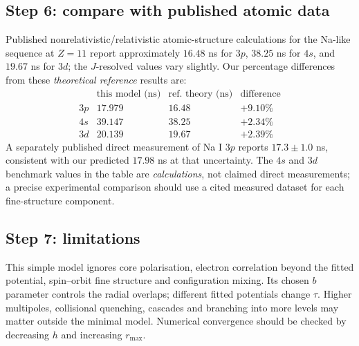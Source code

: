 \subsection*{Step 6: compare with published atomic data}
Published nonrelativistic/relativistic
atomic-structure calculations for the Na-like
sequence at \(Z=11\) report approximately
\(16.48\) ns for \(3p\), \(38.25\) ns for
\(4s\), and \(19.67\) ns for \(3d\);
the \(J\)-resolved values vary slightly.
Our percentage differences from these
\emph{theoretical reference} results are:
\[
\begin{array}{c|r|r|r}
&\text{this model (ns)}&
\text{ref. theory (ns)}&
\text{difference}\\\hline
3p&17.979&16.48&+9.10\%\\
4s&39.147&38.25&+2.34\%\\
3d&20.139&19.67&+2.39\%
\end{array}
\]
A separately published direct measurement
of Na I \(3p\) reports \(17.3\pm1.0\) ns,
consistent with our predicted \(17.98\) ns
at that uncertainty. The \(4s\) and \(3d\)
benchmark values in the table are
\emph{calculations}, not claimed direct
measurements; a precise experimental
comparison should use a cited measured
dataset for each fine-structure component.

\subsection*{Step 7: limitations}
This simple model ignores core polarisation,
electron correlation beyond the fitted
potential, spin--orbit fine structure and
configuration mixing. Its chosen \(b\)
parameter controls the radial overlaps;
different fitted potentials change \(\tau\).
Higher multipoles, collisional quenching,
cascades and branching into more levels
may matter outside the minimal model.
Numerical convergence should be checked by
decreasing \(h\) and increasing \(r_{\max}\).

